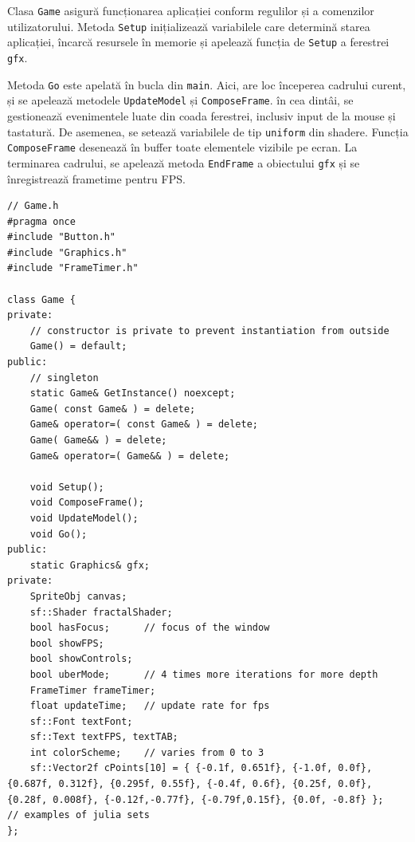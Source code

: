 \documentclass[12pt]{report}
\begin{document}
Clasa \texttt{Game} asigură funcționarea aplicației conform regulilor și a comenzilor utilizatorului.
Metoda \texttt{Setup} inițializează variabilele care determină starea aplicației, încarcă resursele în memorie și apelează
funcția de \texttt{Setup} a ferestrei \texttt{gfx}.

Metoda \texttt{Go} este apelată în bucla din \texttt{main}. Aici, are loc începerea cadrului curent,
și se apelează metodele \texttt{UpdateModel} și \texttt{ComposeFrame}.
în cea dintâi, se gestionează evenimentele luate din coada ferestrei, inclusiv input de la mouse și tastatură.
De asemenea, se setează variabilele de tip \texttt{uniform} din shadere.
Funcția \texttt{ComposeFrame} desenează în buffer toate elementele vizibile pe ecran. La terminarea cadrului,
se apelează metoda \texttt{EndFrame} a obiectului \texttt{gfx} și se înregistrează frametime pentru FPS.
\begin{lstlisting}[caption = Game.h]
// Game.h
#pragma once
#include "Button.h"
#include "Graphics.h"
#include "FrameTimer.h"

class Game {
private:
	// constructor is private to prevent instantiation from outside
	Game() = default;
public:
	// singleton
	static Game& GetInstance() noexcept;
	Game( const Game& ) = delete;
	Game& operator=( const Game& ) = delete;
	Game( Game&& ) = delete;
	Game& operator=( Game&& ) = delete;

	void Setup();
	void ComposeFrame();
	void UpdateModel();
	void Go();
public:
	static Graphics& gfx;
private:
	SpriteObj canvas;
	sf::Shader fractalShader;
	bool hasFocus;		// focus of the window
	bool showFPS;
	bool showControls;
	bool uberMode;		// 4 times more iterations for more depth
	FrameTimer frameTimer;
	float updateTime;	// update rate for fps
	sf::Font textFont;
	sf::Text textFPS, textTAB;
	int colorScheme;	// varies from 0 to 3
	sf::Vector2f cPoints[10] = { {-0.1f, 0.651f}, {-1.0f, 0.0f}, {0.687f, 0.312f}, {0.295f, 0.55f}, {-0.4f, 0.6f}, {0.25f, 0.0f}, {0.28f, 0.008f}, {-0.12f,-0.77f}, {-0.79f,0.15f}, {0.0f, -0.8f} };	// examples of julia sets
};
\end{lstlisting}
\newpage
\end{document}
